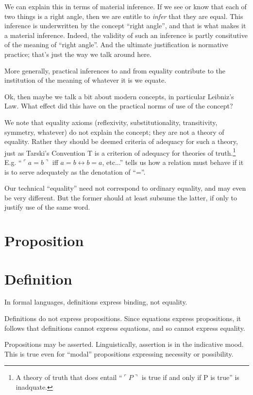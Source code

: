 \documentclass{article}
\begin{document}
We can explain this in terms of material inference. If we see or know
that each of two things is a right angle, then we are entitle to
\textit{infer} that they are equal. This inference is underwritten by
the concept ``right angle'', and that is what makes it a material
inference. Indeed, the validity of such an inference is partly
consitutive of the meaning of ``right angle''. And the ultimate
justification is normative practice; that's just the way we talk
around here.

More generally, practical inferences to and from equality contribute
to the institution of the meaning of whatever it is we equate.

Ok, then maybe we talk a bit about modern concepts, in particular
Leibniz's Law. What effect did this have on the practical norms of use
of the concept?

We note that equality axioms (reflexivity, substitutionality,
transitivity, symmetry, whatever) do not explain the concept; they are
not a theory of equality. Rather they should be deemed criteria of
adequacy for such a theory, just as Tarski's Convention T is a
criterion of adequacy for theories of truth.\footnote{A theory of
truth that does entail ``\(\ulcorner P\urcorner\) is true if and only
if P is true'' is inadquate.} E.g. ``\(\ulcorner a = b\urcorner\) iff
\(a=b ↔ b=a\), etc...'' tells us how a relation must behave if it is
to serve adequately as the denotation of ``=''.

Our technical ``equality'' need not correspond to ordinary equality,
and may even be very different. But the former should at least subsume
the latter, if only to justify use of the same word.

\section{Proposition}



\section{Definition}

In formal languages, definitions express binding, not equality.

Definitions do not express propositions. Since equations express
propositions, it follows that definitions cannot express equations,
and so cannot express equality.

Propositions may be asserted. Linguistically, assertion is in the
indicative mood. This is true even for ``modal'' propositions
expressing necessity or possibility.
\end{document}
